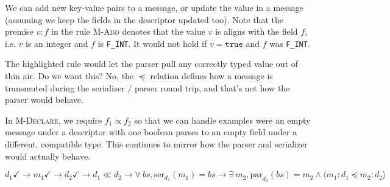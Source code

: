 We can add new key-value pairs to a message, or update the value in a message
(assuming we keep the fields in the descriptor updated too). Note that the
premise $v : f$ in the rule \textsc{M-Add} denotes that the value $v$ is aligns
with the field $f$, i.e. $v$ is an integer and $f$ is \verb|F_INT|. It would not
hold if $v = \mathtt{true}$ and $f$ was \verb|F_INT|.

The highlighted rule would let the parser pull any correctly typed value out of
thin air. Do we want this? No, the $\preceq$ relation defines how a message is
transmuted during the serializer / parser round trip, and that's not how the
parser would behave.

In \textsc{M-Declare}, we require $f_1 \propto f_2$ so that we can handle examples
were an empty message under a descriptor with one boolean parses to an empty
field under a different, compatible type. This continues to mirror how the
parser and serializer would actually behave.

\vspace{1em}
\begin{theorem}\label{thm:inter-compat}
  \[
    d_1 \checkmark \rightarrow m_1 \checkmark \rightarrow d_2 \checkmark
    \rightarrow d_1 \ll d_2 \rightarrow \forall\ bs, \mathrm{ser}_{d_1}(m_1) =
    bs \rightarrow \exists\ m_2, \mathrm{par}_{d_2}(bs) = m_2 \wedge \langle m_1
    : d_1 \preceq m_2 : d_2 \rangle
  \] 
\end{theorem}


